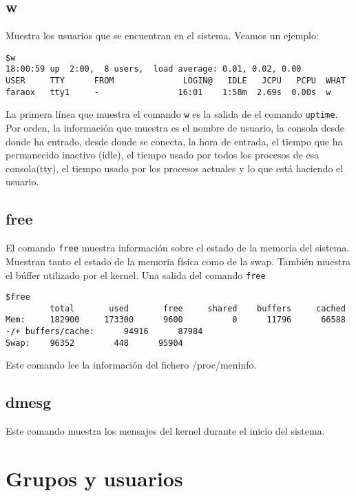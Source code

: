 \subsection*{w}
Muestra los usuarios que se encuentran en el sistema. Veamos un ejemplo:

\begin{verbatim}
$w
18:00:59 up  2:00,  8 users,  load average: 0.01, 0.02, 0.00
USER     TTY      FROM              LOGIN@   IDLE   JCPU   PCPU  WHAT
faraox   tty1     -                16:01    1:58m  2.69s  0.00s  w
\end{verbatim}

La primera  línea que muestra  el comando {\tt w}  es la salida  de el
comando  {\tt uptime}.  Por orden,  la información  que muestra  es el
nombre de usuario,  la consola desde donde ha entrado,  desde donde se
conecta, la  hora de  entrada, el tiempo  que ha  permanecido inactivo
(idle), el tiempo usado por todos los procesos de esa consola(tty), el
tiempo  usado por  los procesos  actuales y  lo que  está haciendo  el
usuario.

\subsection*{free}
El  comando {\tt  free}  muestra  información sobre  el  estado de  la
memoria del  sistema. Muestran  tanto el estado  de la  memoria física
como de  la swap. También muestra  el búffer utilizado por  el kernel.
Una salida del comando {\tt free}

\begin{verbatim}
$free
	     total       used       free     shared    buffers     cached
Mem:     182900     173300      9600          0      11796      66588
-/+ buffers/cache:      94916      87984
Swap:    96352        448      95904
\end{verbatim}

Este comando lee la información del fichero /proc/meninfo.

\subsection*{dmesg}
Este comando  muestra los  mensajes del kernel  durante el  inicio del
sistema.


\section{Grupos y usuarios}


